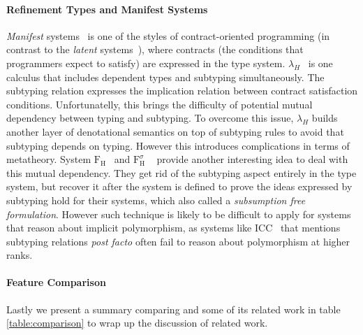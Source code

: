 \paragraph{Refinement Types and Manifest Systems}

\emph{Manifest} systems~\citep{manifestcontracts} is one of the styles of
contract-oriented programming (in contrast to the \emph{latent} systems~\citep{latentcontracts}),
where contracts (the conditions that programmers expect to satisfy) are expressed
in the type system. $\lambda_H$~\citep{hybridtypes,manifestcontracts} is one calculus that
includes dependent types and subtyping simultaneously. The subtyping relation
expresses the implication relation between contract satisfaction conditions. Unfortunatelly,
this brings the difficulty of potential mutual dependency between typing and subtyping.
To overcome this issue, $\lambda_H$ builds another layer of denotational semantics on top of
subtyping rules to avoid that subtyping depends on typing. However this introduces
complications in terms of metatheory.
System $\mathrm{F}_\mathrm{H}$~\citep{fh} and $\mathrm{F}_\mathrm{H}^\sigma$
~\citep{fhsigma} provide another
interesting idea to deal with this mutual dependency. They get rid of the
subtyping aspect entirely in the type system, but recover it after the system is
defined to prove the ideas expressed by subtyping hold for their systems,
which \citet{fhsigma} also called a \emph{subsumption free formulation}.
However such technique is likely to be difficult to apply for systems that
reason about implicit polymorphism,
as systems like ICC~\citep{miquel2001implicit} that mentions subtyping relations \emph{post facto}
often fail to reason about polymorphism at higher ranks.

\paragraph{Feature Comparison}

Lastly we present a summary comparing \name and some of its related work in
table \ref{table:comparison} to wrap up the discussion of related work.

